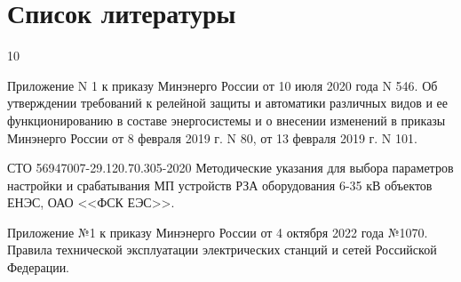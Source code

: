 {\color{unimain}\section[Список литературы]{Список литературы}}
\color{black}

\makeatletter
\providecommand{\bibsection}{}   %
\renewcommand{\bibsection}{}      %
\makeatother

\begin{thebibliography}{10}

	Приложение N 1 к приказу Минэнерго России от 10 июля 2020 года N 546. Об утверждении требований к релейной защиты и автоматики различных видов и ее функционированию в составе энергосистемы и о внесении изменений в приказы Минэнерго России от 8 февраля 2019 г. N 80, от 13 февраля 2019 г. N 101.

	СТО 56947007-29.120.70.305-2020 Методические указания для выбора параметров настройки и срабатывания МП устройств РЗА оборудования 6-35 кВ объектов ЕНЭС, ОАО <<ФСК ЕЭС>>.

	Приложение №1 к приказу Минэнерго России от 4 октября 2022 года №1070. Правила технической эксплуатации электрических станций и сетей Российской Федерации.

\end{thebibliography}


